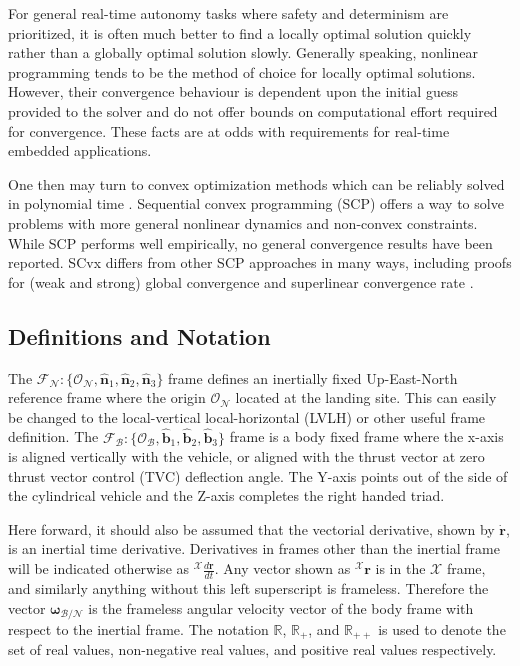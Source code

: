 \documentclass[conf]{new-aiaa}
\begin{document}
For general real-time autonomy tasks where safety and determinism are prioritized, it is often much better to find a locally optimal solution quickly rather than a globally optimal solution slowly. Generally speaking, nonlinear programming tends to be the method of choice for locally optimal solutions. However, their convergence behaviour is dependent upon the initial guess provided to the solver and do not offer bounds on computational effort required for convergence. These facts are at odds with requirements for real-time embedded applications.

One then may turn to convex optimization methods which can be reliably solved in polynomial time \cite{nesterov1994interior}. Sequential convex programming (SCP) offers a way to solve problems with more general nonlinear dynamics and non-convex constraints. While SCP performs well empirically, no general convergence results have been reported. SCvx differs from other SCP approaches in many ways, including proofs for (weak and strong) global convergence and superlinear convergence rate \cite{mao2016successive}.

\subsection{Definitions and Notation}
The $\mathcal{F}_\mathcal{N} : \{\mathcal{O}_\mathcal{N}, \hat{\bm{n}}_1, \hat{\bm{n}}_2, \hat{\bm{n}}_3 \}$ frame defines an inertially fixed Up-East-North reference frame where the origin $\mathcal{O}_\mathcal{N}$ located at the landing site. This can easily be changed to the local-vertical local-horizontal (LVLH) or other useful frame definition. The $\mathcal{F}_\mathcal{B}: \{\mathcal{O}_\mathcal{B}, \hat{\bm{b}}_1, \hat{\bm{b}}_2, \hat{\bm{b}}_3 \}$ frame is a body fixed frame where the x-axis is aligned vertically with the vehicle, or aligned with the thrust vector at zero thrust vector control (TVC) deflection angle. The Y-axis points out of the side of the cylindrical vehicle and the Z-axis completes the right handed triad.

Here forward, it should also be assumed that the vectorial derivative, shown by $\mathbf{\dot{r}}$, is an inertial time derivative. Derivatives in frames other than the inertial frame will be indicated otherwise as $^\mathcal{X}\frac{d \mathbf{r}}{dt}$. Any vector shown as $^\mathcal{X}\mathbf{r}$ is in the $\mathcal{X}$ frame, and similarly anything without this left superscript is frameless. Therefore the vector $\bm{\omega}_{\mathcal{B/N}}$ is the frameless angular velocity vector of the body frame with respect to the inertial frame. The notation $\mathbb{R}$, $\mathbb{R}_+$, and $\mathbb{R}_{++}$ is used to denote the set of real values, non-negative real values, and positive real values respectively.
\end{document}
